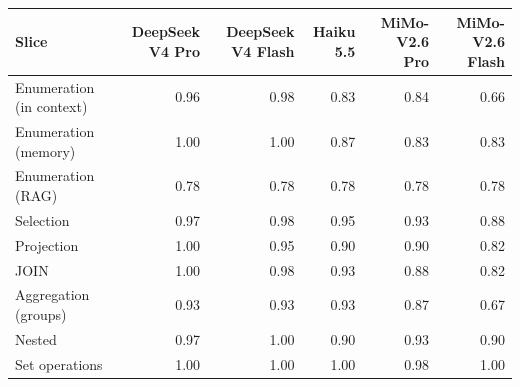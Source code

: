 \begin{tabular}{lrrrrr}
\toprule
Slice & DeepSeek V4 Pro & DeepSeek V4 Flash & Haiku 5.5 & MiMo-V2.6 Pro & MiMo-V2.6 Flash \\
\midrule
Enumeration (in context) & 0.96 & 0.98 & 0.83 & 0.84 & 0.66 \\
Enumeration (memory) & 1.00 & 1.00 & 0.87 & 0.83 & 0.83 \\
Enumeration (RAG) & 0.78 & 0.78 & 0.78 & 0.78 & 0.78 \\
Selection & 0.97 & 0.98 & 0.95 & 0.93 & 0.88 \\
Projection & 1.00 & 0.95 & 0.90 & 0.90 & 0.82 \\
JOIN & 1.00 & 0.98 & 0.93 & 0.88 & 0.82 \\
Aggregation (groups) & 0.93 & 0.93 & 0.93 & 0.87 & 0.67 \\
Nested & 0.97 & 1.00 & 0.90 & 0.93 & 0.90 \\
Set operations & 1.00 & 1.00 & 1.00 & 0.98 & 1.00 \\
\bottomrule
\end{tabular}

